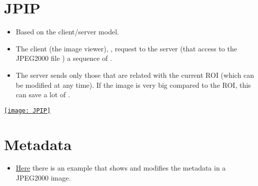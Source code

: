 \section{\gls{JPIP}}
\begin{itemize}
\item Based on the client/server model.
\item The client (the image viewer), , request to the server (that access to the
  JPEG2000 file ) a sequence
  of   \cite{ORTIZ04b}.
\item The server sends only those  that are related with the current
  \gls{ROI} (which can be modified at any time). If the image is very
  big compared to the \gls{ROI}, this can save a lot of
  .
\end{itemize}
\begin{center}
  \href{http://www.hpca.ual.es/~vruiz/papers/ORTIZ04c.pdf}{\texttt{[image: JPIP]}}
\end{center}

\section{Metadata}
\begin{itemize}
\item
  \href{https://github.com/vicente-gonzalez-ruiz/medical_imaging/blob/main/notebooks/JPEG2000_add_metadata.ipynb}{Here}
  there is an example that shows and modifies the metadata in a JPEG2000
  image.
\end{itemize}
